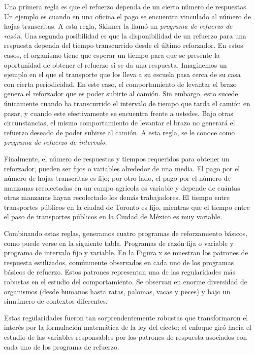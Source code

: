 \documentclass[
  letterpaper,
]{book}
\makeatletter
\newcommand*\pandocbounded[1]{%
  \sbox\pandoc@box{#1}%
  \Gscale@div\@tempa{\textheight}{\dimexpr\ht\pandoc@box+\dp\pandoc@box\relax}%
  \Gscale@div\@tempb{\linewidth}{\wd\pandoc@box}%
  \ifdim\@tempb\p@<\@tempa\p@\let\@tempa\@tempb\fi%
  \ifdim\@tempa\p@<\p@\scalebox{\@tempa}{\usebox\pandoc@box}%
  \else\usebox{\pandoc@box}%
  \fi%
}
\makeatother
\begin{document}
Una primera regla es que el refuerzo dependa de un cierto número de
respuestas. Un ejemplo es cuando en una oficina el pago se encuentra
vinculado al número de hojas transcritas. A esta regla, Skinner la llamó
un \emph{programa de refuerzo de razón}. Una segunda posibilidad es que
la disponibilidad de un refuerzo para una respuesta dependa del tiempo
transcurrido desde el último reforzador. En estos casos, el organismo
tiene que esperar un tiempo para que se presente la oportunidad de
obtener el refuerzo si se da una respuesta. Imaginemos un ejemplo en el
que el transporte que los lleva a su escuela pasa cerca de su casa con
cierta periodicidad. En este caso, el comportamiento de levantar el
brazo genera el reforzador que es poder subirte al camión. Sin embargo,
esto sucede únicamente cuando ha transcurrido el intervalo de tiempo que
tarda el camión en pasar, y cuando este efectivamente se encuentra
frente a ustedes. Bajo otras circunstancias, el mismo comportamiento de
levantar el brazo no generará el refuerzo deseado de poder subirse al
camión. A esta regla, se le conoce como \emph{programa de refuerzo de
intervalo}.

Finalmente, el número de respuestas y tiempos requeridos para obtener un
reforzador, pueden ser fijos o variables alrededor de una media. El pago
por el número de hojas transcritas es fijo; por otro lado, el pago por
el número de manzanas recolectadas en un campo agrícola es variable y
depende de cuántas otras manzanas hayan recolectado los demás
trabajadores. El tiempo entre transportes públicos en la ciudad de
Toronto es fijo, mientras que el tiempo entre el paso de transportes
públicos en la Ciudad de México es muy variable.

Combinando estas reglas, generamos cuatro programas de reforzamiento
básicos, como puede verse en la siguiente tabla. Programas de razón fija
o variable y programa de intervalo fijo y
variable.\href{DraggedImage.png}{} En la Figura x se muestran los
patrones de respuesta estilizados, comúnmente observados en cada uno de
los programas básicos de refuerzo. Estos patrones representan una de las
regularidades más robustas en el estudio del comportamiento. Se observan
en enorme diversidad de organismos (desde humanos hasta ratas, palomas,
vacas y peces) y bajo un sinnúmero de contextos diferentes.

\pandocbounded{\texttt{[image: DraggedImage-1.png]}}

Estas regularidades fueron tan sorprendentemente robustas que
transformaron el interés por la formulación matemática de la ley del
efecto: el enfoque giró hacia el estudio de las variables responsables
por los patrones de respuesta asociados con cada uno de los programa de
refuerzo.
\end{document}
